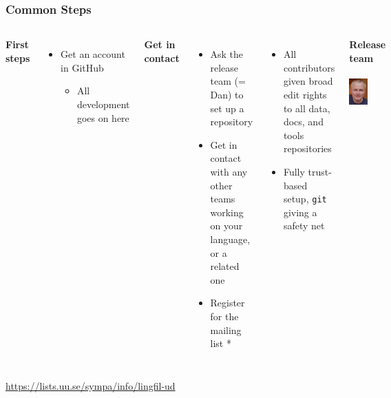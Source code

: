 \documentclass[10pt, compress, aspectratio=169]{beamer}
\begin{document}
\begin{frame}
  \frametitle{Common Steps}
  \begin{columns}
    \textbf{First steps}
    \begin{itemize}
      \item Get an account in GitHub
      \begin{itemize}
        \item All development goes on here
      \end{itemize}
    \end{itemize}
    \textbf{Get in contact}
    \begin{itemize}
      \item Ask the release team (= Dan) to set up a repository
      \item Get in contact with any other teams working
        on your language, or a related one
      \item \alert{Register for the mailing list *}
    \end{itemize}
    \bigskip
    \begin{itemize}
      \item All contributors given broad edit rights to all data, docs, and
          tools repositories
      \item Fully trust-based setup, {\tt git} giving a safety net
    \end{itemize}
    \begin{center}
      \textbf{Release team}
      ~\\
      ~\\
      \includegraphics[width=0.5\textwidth]{images/dan.png}
    \end{center}
  \end{columns}
  \bigskip
  {\small * \url{https://lists.uu.se/sympa/info/lingfil-ud}}
\end{frame}
\end{document}

